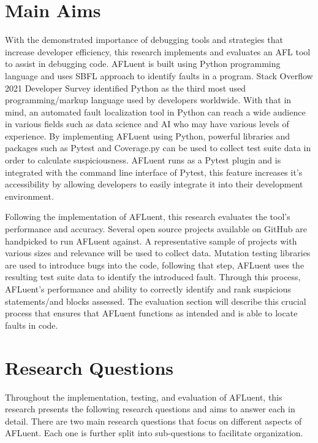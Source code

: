 \section{Main Aims}
\label{sec:aims}

With the demonstrated importance of debugging tools and strategies that increase
developer efficiency, this research implements and evaluates an AFL tool to
assist in debugging code. AFLuent is built using  Python programming
language and uses SBFL approach to identify faults in a
program. Stack Overflow 2021 Developer Survey identified Python as the third
most used programming/markup language used by developers worldwide. With that in
mind, an automated fault localization tool in Python can reach a wide audience
in various fields such as data science and AI who may have various levels of
experience. By implementing AFLuent using Python, powerful libraries and
packages such as Pytest and Coverage.py can be used to collect test suite data
in order to calculate suspiciousness. AFLuent runs as a Pytest plugin and is
integrated with the command line interface of Pytest, this feature increases
it's accessibility by allowing developers to easily integrate it into their
development environment.

Following the implementation of AFLuent, this research evaluates the
tool's performance and accuracy. Several open source projects
available on GitHub are handpicked to run AFLuent against. A representative
sample of projects with various sizes and relevance will be used to collect
data. Mutation testing libraries are used to introduce bugs into the code,
following that step, AFLuent uses the resulting test suite data to identify the
introduced fault. Through this process, AFLuent's performance and ability to
correctly identify and rank suspicious statements/and blocks assessed.
The evaluation section will describe this crucial process that ensures that
AFLuent functions as intended and is able to locate faults in code.

\section{Research Questions}
\label{sec:researchq}

Throughout the implementation, testing, and evaluation of AFLuent, this research
presents the following research questions and aims to answer each in detail.
There are two main research questions that focus on different aspects of
AFLuent. Each one is further split into sub-questions to facilitate organization.

